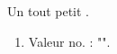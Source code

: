 \documentclass{article}
\begin{document}
Un tout petit .

\begin{enumerate}
    \item Valeur no.  : "".
\end{enumerate}
\end{document}
